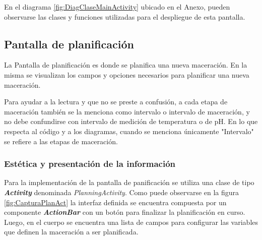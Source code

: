                 \par En el diagrama \ref{fig:DiagClaseMainActivity} ubicado en el Anexo, pueden observarse las clases y funciones utilizadas para el despliegue de esta pantalla.
                
                
        \subsection{Pantalla de planificación}
        \label{DescripPantallaPlanificación}
            \par La Pantalla de planificación es donde se planifica una nueva maceración. En la misma se visualizan los campos y opciones necesarios para planificar una nueva maceración. 
            \par Para ayudar a la lectura y que no se preste a confusión, a cada etapa de maceración también se la menciona como intervalo o intervalo de maceración, y no debe confundirse con intervalo de medición de temperatura o de pH. En lo que respecta al código y a los diagramas, cuando se menciona únicamente "Intervalo" se refiere a las etapas de maceración.
        
        \subsubsection{Estética y presentación de la información}
                \par Para la implementación de la pantalla de panificación se utiliza una clase de tipo \textbf{\textit{\gls{Activity}}} denominada \textit{PlanningActivity}. Como puede observarse en la figura \ref{fig:CapturaPlanAct} la interfaz definida se encuentra compuesta por un componente \textbf{\textit{\gls{ActionBar}}} con un botón para finalizar la planificación en curso. Luego, en el cuerpo se encuentra una lista de campos para configurar las variables que definen la maceración a ser planificada.
                
